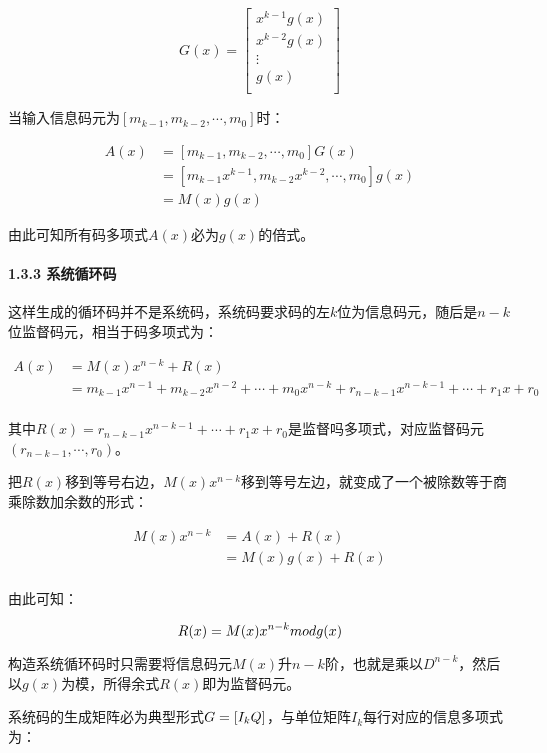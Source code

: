 \documentclass[
]{article}
\begin{document}
$$
G(x)=
\left[
\begin{matrix}
x^{k-1}g(x)\\
x^{k-2}g(x)\\
 \vdots \\
g(x)\\
\end{matrix}
\right]
$$

当输入信息码元为$[m_{k-1},m_{k-2},\cdots,m_0]$时：

$$
\begin{align}
A(x)&=[m_{k-1},m_{k-2},\cdots,m_0]G(x)\\
    &=[m_{k-1}x^{k-1},m_{k-2}x^{k-2},\cdots,m_0]g(x)\\
    &=M(x)g(x)
\end{align}
$$

由此可知所有码多项式$A(x)$必为$g(x)$的倍式。

\hypertarget{header-n61}{%
\paragraph{1.3.3 系统循环码}\label{header-n61}}

这样生成的循环码并不是系统码，系统码要求码的左$k$位为信息码元，随后是$n-k$位监督码元，相当于码多项式为：

$$
\begin{align}
A(x)&=M(x)x^{n-k}+R(x)\\
    &=m_{k-1}x^{n-1}+m_{k-2}x^{n-2}+\cdots+m_0x^{n-k}+r_{n-k-1}x^{n-k-1}+\cdots+r_1x+r_0\\
\end{align}
$$

其中$R(x)=r_{n-k-1}x^{n-k-1}+\cdots+r_1x+r_0$是监督吗多项式，对应监督码元$(r_{n-k-1},\cdots,r_{0})$。

把$R(x)$移到等号右边，$M(x)x^{n-k}$移到等号左边，就变成了一个被除数等于商乘除数加余数的形式：

$$
\begin{align}
M(x)x^{n-k}&=A(x)+R(x)\\
    	&=M(x)g(x)+R(x)\\
\end{align}
$$

由此可知：

$$
R(x)=M(x)x^{n-k} \space mod \space g(x)
$$

构造系统循环码时只需要将信息码元$M(x)$升$n-k$阶，也就是乘以$D^{n-k}$，然后以$g(x)$为模，所得余式$R(x)$即为监督码元。

系统码的生成矩阵必为典型形式$G=[I_k \space Q]$，与单位矩阵$I_k$每行对应的信息多项式为：
\end{document}
